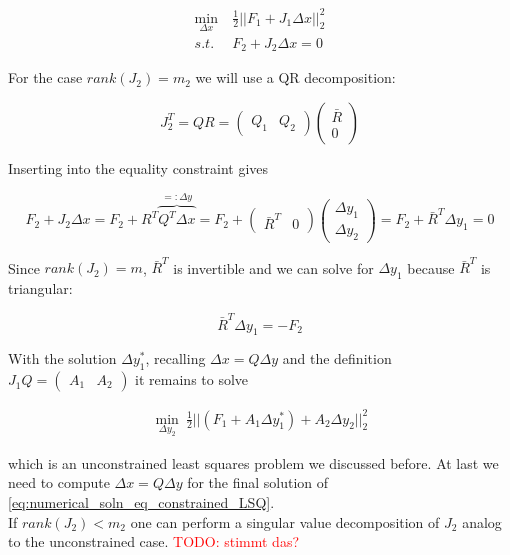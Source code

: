 \documentclass{scrartcl}[12pt, halfparskip]
\newcommand{\todo}[1]{\textcolor{red}{TODO: #1}}
\begin{document}
\begin{align}
	\min_{\Delta x} & \ \frac{1}{2} || F_1 + J_1 \Delta x ||_2^2 \label{eq:numerical_soln_eq_constrained_LSQ} \\
	s.t. & \ F_2 + J_2 \Delta x = 0 \nonumber
\end{align}

For the case $rank(J_2)=m_2$ we will use a QR decomposition:

\begin{equation}
	J_2^T = Q R = 
	\begin{pmatrix}
		Q_1 & Q_2
	\end{pmatrix}
	\begin{pmatrix}
		\bar{R} \\
		0
	\end{pmatrix}
\end{equation}

Inserting into the equality constraint gives

\begin{equation}
	F_2 + J_2 \Delta x = F_2 + R^T \overbrace{Q^T \Delta x}^{=: \Delta y} = F_2 +
	\begin{pmatrix}
		\bar{R}^T & 0
	\end{pmatrix} 
	\begin{pmatrix}
		\Delta y_1 \\
		\Delta y_2
	\end{pmatrix} = F_2 + \bar{R}^T \Delta y_1 = 0
\end{equation}

Since $rank(J_2)=m$, $\bar{R}^T$ is invertible and we can solve for $\Delta y_1$ because $\bar{R}^T$ is triangular:

\begin{equation}
	\bar{R}^T \Delta y_1 = -F_2
\end{equation}

With the solution $\Delta y_1^*$, recalling $\Delta x = Q \Delta y$ and the definition $J_1 Q = \begin{pmatrix} A_1 & A_2 \end{pmatrix}$ it remains to solve

\begin{align}
	\min_{\Delta y_2} \ \frac{1}{2} || (F_1 + A_1 \Delta y_1^*) + A_2 \Delta y_2 ||_2^2
\end{align}

which is an unconstrained least squares problem we discussed before. At last we need to compute $\Delta x = Q \Delta y$ for the final solution of \eqref{eq:numerical_soln_eq_constrained_LSQ}. \\
If $rank(J_2) < m_2$ one can perform a singular value decomposition of $J_2$ analog to the unconstrained case. \todo{stimmt das?}
\end{document}
